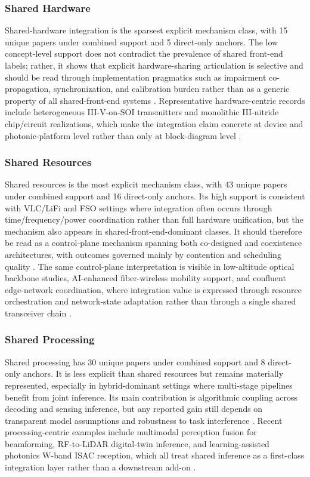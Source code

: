 \documentclass[letterpaper,journal]{IEEEtran}
\begin{document}
\subsubsection{Shared Hardware}
Shared-hardware integration is the sparsest explicit mechanism class, with 15 unique papers under combined support and 5 direct-only anchors. The low concept-level support does not contradict the prevalence of shared front-end labels; rather, it shows that explicit hardware-sharing articulation is selective and should be read through implementation pragmatics such as impairment co-propagation, synchronization, and calibration burden rather than as a generic property of all shared-front-end systems \cite{O_ISAC_021,O_ISAC_164,O_ISAC_324,O_ISAC_056,O_ISAC_161}.
Representative hardware-centric records include heterogeneous III-V-on-SOI transmitters and monolithic III-nitride chip/circuit realizations, which make the integration claim concrete at device and photonic-platform level rather than only at block-diagram level \cite{O_ISAC_036,O_ISAC_354,O_ISAC_360}.

\subsubsection{Shared Resources}
Shared resources is the most explicit mechanism class, with 43 unique papers under combined support and 16 direct-only anchors. Its high support is consistent with VLC/LiFi and FSO settings where integration often occurs through time/frequency/power coordination rather than full hardware unification, but the mechanism also appears in shared-front-end-dominant classes. It should therefore be read as a control-plane mechanism spanning both co-designed and coexistence architectures, with outcomes governed mainly by contention and scheduling quality \cite{O_ISAC_061,O_ISAC_114,O_ISAC_142,O_ISAC_141,O_ISAC_021}.
The same control-plane interpretation is visible in low-altitude optical backbone studies, AI-enhanced fiber-wireless mobility support, and confluent edge-network coordination, where integration value is expressed through resource orchestration and network-state adaptation rather than through a single shared transceiver chain \cite{O_ISAC_083,O_ISAC_102,O_ISAC_340}.

\subsubsection{Shared Processing}
Shared processing has 30 unique papers under combined support and 8 direct-only anchors. It is less explicit than shared resources but remains materially represented, especially in hybrid-dominant settings where multi-stage pipelines benefit from joint inference. Its main contribution is algorithmic coupling across decoding and sensing inference, but any reported gain still depends on transparent model assumptions and robustness to task interference \cite{O_ISAC_086,O_ISAC_039,O_ISAC_134,O_ISAC_381,O_ISAC_161}.
Recent processing-centric examples include multimodal perception fusion for beamforming, RF-to-LiDAR digital-twin inference, and learning-assisted photonics W-band ISAC reception, which all treat shared inference as a first-class integration layer rather than a downstream add-on \cite{O_ISAC_138,O_ISAC_140,O_ISAC_242}.
\end{document}
